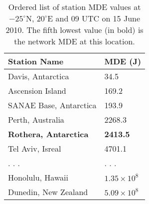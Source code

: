 \documentclass[draft,ras]{agutex}
\begin{document}
\clearpage

\begin{table}[ht!]
\caption{Ordered list of station MDE values at $-25^\circ$N, $20^\circ$E and 09 UTC on 15 June 2010. The fifth lowest value (in bold) is the network MDE at this location.}
\begin{center}
\begin{tabular}{p{2in}p{1in}}
\hline
Station Name 		& 	MDE (J)\\
\hline
\rule{0pt}{3ex}
Davis, Antarctica	&	34.5\\ 
Ascension Island	&	169.2\\ 
SANAE Base, Antarctica	&	193.9\\ 
Perth, Australia	&	2268.3\\ 
{\bf Rothera, Antarctica}	&	{\bf 2413.5}\\ 
Tel Aviv, Isreal	&	4701.1\\ 
. . .	&	. . .\\ 
Honolulu, Hawaii	&	$1.35 \times 10^8$\\ 
Dunedin, New Zealand	&	$5.09 \times 10^8$\\ 
\hline
\end{tabular}
\end{center}
\label{mdeTable}
\end{table}
\end{document}
